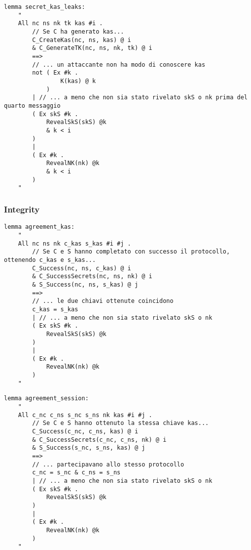 \begin{lstlisting}[caption={Se il client e il server hanno ottenuto una chiave condivisa kas,
    sono i soli a conoscerla.
    Questa rimane sicura anche se avvengono dei leak a posteriori di informazioni segrete,
    garantendo forward secrecy, purchè ciò avvenga dopo il quarto messaggio del protocollo.},
    label=cod:lemma:secret_kas_leaks]
lemma secret_kas_leaks:
    "
    All nc ns nk tk kas #i .
        // Se C ha generato kas...
        C_CreateKas(nc, ns, kas) @ i
        & C_GenerateTK(nc, ns, nk, tk) @ i
        ==> 
        // ... un attaccante non ha modo di conoscere kas
        not ( Ex #k .
                K(kas) @ k
            )
        | // ... a meno che non sia stato rivelato skS o nk prima del quarto messaggio
        ( Ex skS #k .
            RevealSkS(skS) @k
            & k < i
        )
        |
        ( Ex #k .
            RevealNK(nk) @k
            & k < i
        )
    "
\end{lstlisting}

\subsubsection{Integrity}

\begin{lstlisting}[caption={Se il client e il server hanno ottenuto una chiave condivisa kas nella 
    stessa sessione, questa è uguale per entrambi},
    label=cod:lemma:agreement_kas]
lemma agreement_kas:
    "
    All nc ns nk c_kas s_kas #i #j .
        // Se C e S hanno completato con successo il protocollo, ottenendo c_kas e s_kas...
        C_Success(nc, ns, c_kas) @ i
        & C_SuccessSecrets(nc, ns, nk) @ i
        & S_Success(nc, ns, s_kas) @ j
        ==>
        // ... le due chiavi ottenute coincidono
        c_kas = s_kas
        | // ... a meno che non sia stato rivelato skS o nk
        ( Ex skS #k .
            RevealSkS(skS) @k
        )
        |
        ( Ex #k .
            RevealNK(nk) @k
        )
    "
\end{lstlisting}

\begin{lstlisting}[caption={Se il client e il server hanno ottenuto una stessa chiave condivisa kas,
    è perchè stanno partecipendo alla medesima sessione},
    label=cod:lemma:agreement_session]
lemma agreement_session:
    "
    All c_nc c_ns s_nc s_ns nk kas #i #j .
        // Se C e S hanno ottenuto la stessa chiave kas...
        C_Success(c_nc, c_ns, kas) @ i
        & C_SuccessSecrets(c_nc, c_ns, nk) @ i
        & S_Success(s_nc, s_ns, kas) @ j
        ==>
        // ... partecipavano allo stesso protocollo
        c_nc = s_nc & c_ns = s_ns
        | // ... a meno che non sia stato rivelato skS o nk
        ( Ex skS #k .
            RevealSkS(skS) @k
        )
        |
        ( Ex #k .
            RevealNK(nk) @k
        )
    "
\end{lstlisting}